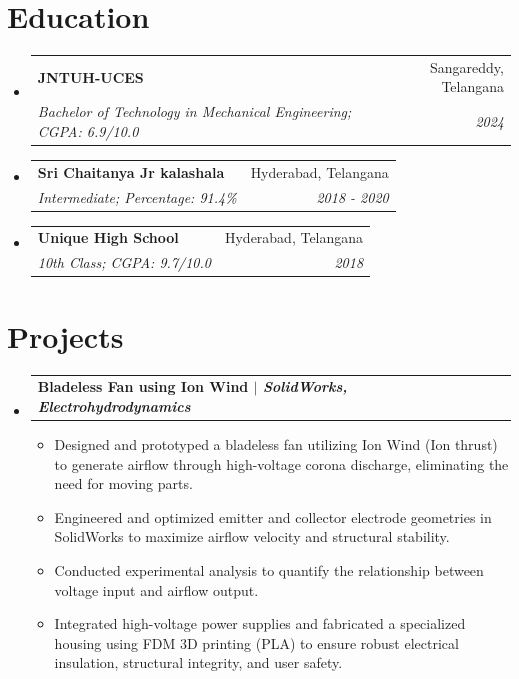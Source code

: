 \documentclass[letterpaper,11pt]{article}
\makeatletter
\newcommand{\resumeItem}[1]{
  \item\small{
    {#1 \vspace{-2pt}}
  }
}
\newcommand{\resumeSubheading}[4]{
  \vspace{-2pt}\item
    \begin{tabular*}{0.97\textwidth}[t]{l@{\extracolsep{\fill}}r}
      \textbf{#1} & #2 \\
      \textit{\small#3} & \textit{\small #4} \\
    \end{tabular*}\vspace{-7pt}
}
\newcommand{\resumeProjectHeading}[2]{
    \item
    \begin{tabular*}{0.97\textwidth}{l@{\extracolsep{\fill}}r}
      \small\textbf{#1} & #2 \\
    \end{tabular*}\vspace{-7pt}
}
\newcommand{\resumeSubHeadingListStart}{\begin{itemize}[leftmargin=0.15in, label={}]}
\newcommand{\resumeSubHeadingListEnd}{\end{itemize}}
\newcommand{\resumeItemListStart}{\begin{itemize}}
\newcommand{\resumeItemListEnd}{\end{itemize}\vspace{-5pt}}
\makeatother
\begin{document}
\section{Education}
  \resumeSubHeadingListStart
    \resumeSubheading
      {JNTUH-UCES}{Sangareddy, Telangana}
      {Bachelor of Technology in Mechanical Engineering; CGPA: 6.9/10.0}{2024}
      \resumeSubheading
        {Sri Chaitanya Jr kalashala}{Hyderabad, Telangana}
        {Intermediate; Percentage: 91.4\%}{2018 - 2020}
      \resumeSubheading
        {Unique High School}{Hyderabad, Telangana}
        {10th Class; CGPA: 9.7/10.0}{2018}
  \resumeSubHeadingListEnd

\section{Projects}
  \resumeSubHeadingListStart
    \resumeProjectHeading
      {\textbf{Bladeless Fan using Ion Wind} $|$ \emph{SolidWorks, Electrohydrodynamics}}{}
      \resumeItemListStart
        \resumeItem{Designed and prototyped a bladeless fan utilizing Ion Wind (Ion thrust) to generate airflow through high-voltage corona discharge, eliminating the need for moving parts.}
        \resumeItem{Engineered and optimized emitter and collector electrode geometries in SolidWorks to maximize airflow velocity and structural stability.}
        \resumeItem{Conducted experimental analysis to quantify the relationship between voltage input and airflow output.}
        \resumeItem{Integrated high-voltage power supplies and fabricated a specialized housing using FDM 3D printing (PLA) to ensure robust electrical insulation, structural integrity, and user safety.}
      \resumeItemListEnd
  \resumeSubHeadingListEnd
\end{document}
